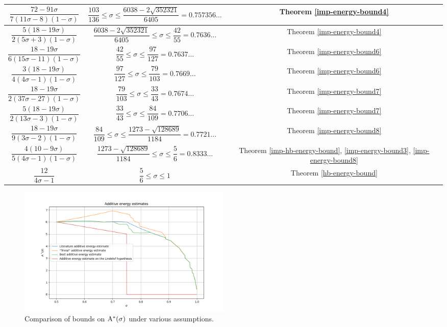 \begin{table}[ht]
\begin{tabular}{|c|c|c|}
    $\dfrac{72 - 91\sigma}{7(11\sigma - 8)(1 - \sigma)}$ & $\dfrac{103}{136} \leq \sigma \le \dfrac{6038 - 2\sqrt{352321}}{6405} = 0.757356\ldots$ & Theorem \ref{imp-energy-bound4}\\
    \hline
    $\dfrac{5(18 - 19\sigma)}{2(5\sigma + 3)(1 - \sigma)}$ & $\dfrac{6038 - 2\sqrt{352321}}{6405} \leq \sigma \le \dfrac{42}{55} = 0.7636\ldots$ & Theorem \ref{imp-energy-bound4}\\
    \hline
    $\dfrac{18 - 19\sigma}{6(15\sigma - 11)(1- \sigma)}$ & $\dfrac{42}{55} \leq \sigma \le \dfrac{97}{127} = 0.7637\ldots$ & Theorem \ref{imp-energy-bound6}\\
    \hline
    $\dfrac{3(18-19\sigma)}{4(4\sigma-1)(1 - \sigma)}$ & $\dfrac{97}{127} \leq \sigma \le \dfrac{79}{103} = 0.7669\ldots$ & Theorem \ref{imp-energy-bound6}\\
    \hline
    $\dfrac{18 - 19\sigma}{2(37\sigma - 27)(1 - \sigma)}$ & $\dfrac{79}{103} \leq \sigma \le \dfrac{33}{43} = 0.7674\ldots$ & Theorem \ref{imp-energy-bound7}\\
    \hline
    $\dfrac{5(18 - 19\sigma)}{2(13\sigma - 3)(1 - \sigma)}$ & $\dfrac{33}{43} \leq \sigma \le \dfrac{84}{109} = 0.7706\ldots$ & Theorem \ref{imp-energy-bound7}\\
    \hline
    $\dfrac{18 - 19\sigma}{9(3\sigma - 2)(1 - \sigma)}$ & $\dfrac{84}{109} \leq \sigma \le \dfrac{1273 - \sqrt{128689}}{1184} = 0.7721\ldots$ & Theorem \ref{imp-energy-bound8}\\
    \hline
    $\dfrac{4(10 - 9\sigma)}{5(4\sigma - 1)(1 - \sigma)}$ & $\dfrac{1273 - \sqrt{128689}}{1184} \leq \sigma \le \dfrac{5}{6} = 0.8333\ldots$ & Theorem \ref{imp-hb-energy-bound}, \ref{imp-energy-bound3}, \ref{imp-energy-bound8}\\
    \hline
    $\dfrac{12}{4\sigma - 1}$ & $\dfrac{5}{6} \leq \sigma \le 1$ & Theorem \ref{hb-energy-bound}\\
    \hline
    \end{tabular}
    \label{zero-density-energy-estimates-table}
\end{table}

\begin{figure}
    \centering
    \includegraphics[width=0.5\textwidth]{chapter/zero_density_energy_estimate.png}
    \caption{Comparison of bounds on $\mathrm{A}^*(\sigma)$ under various assumptions.}
    \label{fig:zero_density_energy_estimate}
\end{figure}
